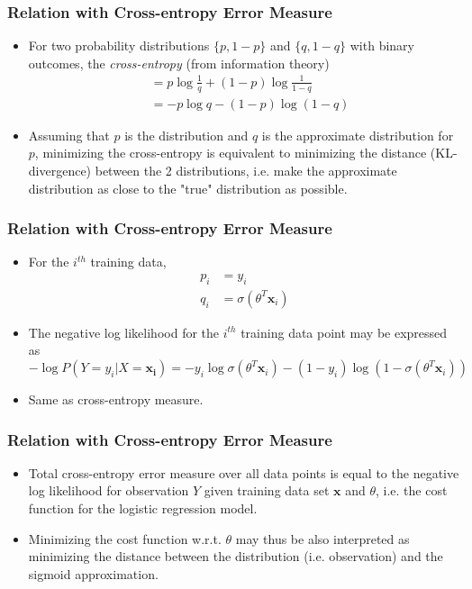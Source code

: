 \begin{frame}
\frametitle{Relation with Cross-entropy Error Measure}
\begin{itemize}
\item For two probability distributions $\{p,1-p\}$ and $\{q,1-q\}$ with binary outcomes, the \textit{cross-entropy} (from information theory) 
\begin{equation}
\begin{split}
&= p \log \frac{1}{q} + (1-p) \log \frac{1}{1-q}\\
&= -p \log q - (1-p) \log (1-q)
\end{split}
\end{equation}
\item Assuming that $p$ is the  distribution and $q$ is the approximate distribution for $p$, minimizing the cross-entropy is equivalent to minimizing the distance (KL-divergence) between the 2 distributions,  i.e. make the approximate distribution as close to the "true" distribution as possible.
\end{itemize}
\end{frame}

\begin{frame}
\frametitle{Relation with Cross-entropy Error Measure}
\begin{itemize}
\item For the $i^{th}$ training data,
\begin{equation}
\begin{split}
p_i &= y_i \\
q_i &= \sigma (\theta^T \mathbf{x}_i)
\end{split}
\end{equation}
\item The negative log likelihood for the $i^{th}$ training data point may be expressed as
\begin{equation}
-\log P(Y=y_i|X=\mathbf{x_i}) = -y_i \log \sigma (\theta^T \mathbf{x}_i) - (1-y_i) \log (1-\sigma (\theta^T \mathbf{x}_i))
\end{equation}
\item Same as cross-entropy measure.
\end{itemize}
\end{frame}

\begin{frame}
\frametitle{Relation with Cross-entropy Error Measure}
\begin{itemize}
\item Total cross-entropy error measure over all data points is equal to the negative log likelihood for observation $Y$ given training data set $\mathbf{x}$ and $\theta$, i.e. the cost function for the logistic regression model.
\item Minimizing the cost function w.r.t. $\theta$ may thus be also interpreted as minimizing the distance between the  distribution (i.e. observation) and the sigmoid approximation.

\end{itemize}
\end{frame}


